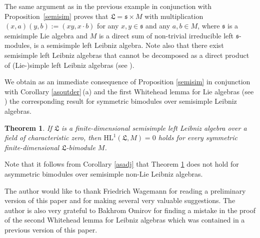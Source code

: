 \documentclass{amsart}
\newtheorem{thm}{Theorem}[section]
\numberwithin{equation}{section}
\newcommand{\HL}{\mathrm{HL}}
\newcommand{\ssf}{\mathfrak{s}}
\newcommand{\lf}{\mathfrak{L}}
\begin{document}
 The same argument as in the previous example in conjunction with
Proposition~\ref{semisim} proves that $\lf=\ssf\times M$ with multiplication $(x,a)(y,b):=
(xy,x\cdot b)$ for any $x,y\in\ssf$ and any $a,b\in M$, where $\ssf$ is a semisimple Lie
algebra and $M$ is a direct sum of non-trivial irreducible left $\ssf$-modules, is a semisimple
left Leibniz algebra. Note also that there exist semisimple left Leibniz algebras that cannot
be decomposed as a direct product of (Lie-)simple left Leibniz algebras (see \cite[Examples
2 and 3]{GVKO}).
\vspace{.2cm}

We obtain as an immediate consequence of Proposition \ref{semisim} in conjunction with
Corollary \ref{asoutder}\,(a) and the first Whitehead lemma for Lie algebras (see \cite[Theorem
13 in Chapter III]{J}) the corresponding result for symmetric bimodules over semisimple
Leibniz algebras.

\begin{thm}\label{1stwhiteheadlem}
If $\lf$ is a finite-dimensional semisimple left Leibniz algebra over a field of characteristic zero,
then $\HL^1(\lf,M)=0$ holds for every symmetric finite-dimensional $\lf$-bimodule $M$.
\end{thm}

Note that it follows from Corollary \ref {asadj} that Theorem \ref{1stwhiteheadlem} does not
hold for asymmetric bimodules over semisimple non-Lie Leibniz algebras.
\vspace{.2cm}


 The author would like to thank Friedrich Wagemann for
reading a preliminary version of this paper and for making several very valuable suggestions.
The author is also very grateful to Bakhrom Omirov for finding a mistake in the proof of the
second Whitehead lemma for Leibniz algebras which was contained in a previous version of
this paper.

\end{document}
